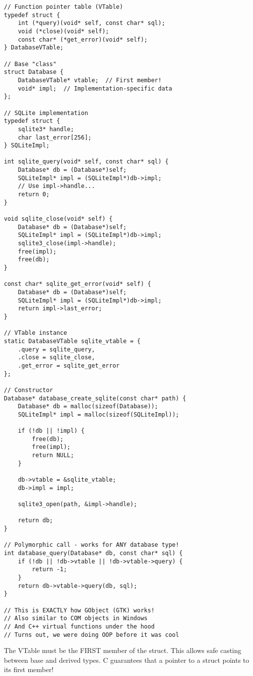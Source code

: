 \begin{lstlisting}
// Function pointer table (VTable)
typedef struct {
    int (*query)(void* self, const char* sql);
    void (*close)(void* self);
    const char* (*get_error)(void* self);
} DatabaseVTable;

// Base "class"
struct Database {
    DatabaseVTable* vtable;  // First member!
    void* impl;  // Implementation-specific data
};

// SQLite implementation
typedef struct {
    sqlite3* handle;
    char last_error[256];
} SQLiteImpl;

int sqlite_query(void* self, const char* sql) {
    Database* db = (Database*)self;
    SQLiteImpl* impl = (SQLiteImpl*)db->impl;
    // Use impl->handle...
    return 0;
}

void sqlite_close(void* self) {
    Database* db = (Database*)self;
    SQLiteImpl* impl = (SQLiteImpl*)db->impl;
    sqlite3_close(impl->handle);
    free(impl);
    free(db);
}

const char* sqlite_get_error(void* self) {
    Database* db = (Database*)self;
    SQLiteImpl* impl = (SQLiteImpl*)db->impl;
    return impl->last_error;
}

// VTable instance
static DatabaseVTable sqlite_vtable = {
    .query = sqlite_query,
    .close = sqlite_close,
    .get_error = sqlite_get_error
};

// Constructor
Database* database_create_sqlite(const char* path) {
    Database* db = malloc(sizeof(Database));
    SQLiteImpl* impl = malloc(sizeof(SQLiteImpl));

    if (!db || !impl) {
        free(db);
        free(impl);
        return NULL;
    }

    db->vtable = &sqlite_vtable;
    db->impl = impl;

    sqlite3_open(path, &impl->handle);

    return db;
}

// Polymorphic call - works for ANY database type!
int database_query(Database* db, const char* sql) {
    if (!db || !db->vtable || !db->vtable->query) {
        return -1;
    }
    return db->vtable->query(db, sql);
}

// This is EXACTLY how GObject (GTK) works!
// Also similar to COM objects in Windows
// And C++ virtual functions under the hood
// Turns out, we were doing OOP before it was cool
\end{lstlisting}

\begin{tipbox}
The VTable must be the FIRST member of the struct. This allows safe casting between base and derived types. C guarantees that a pointer to a struct points to its first member!
\end{tipbox}

